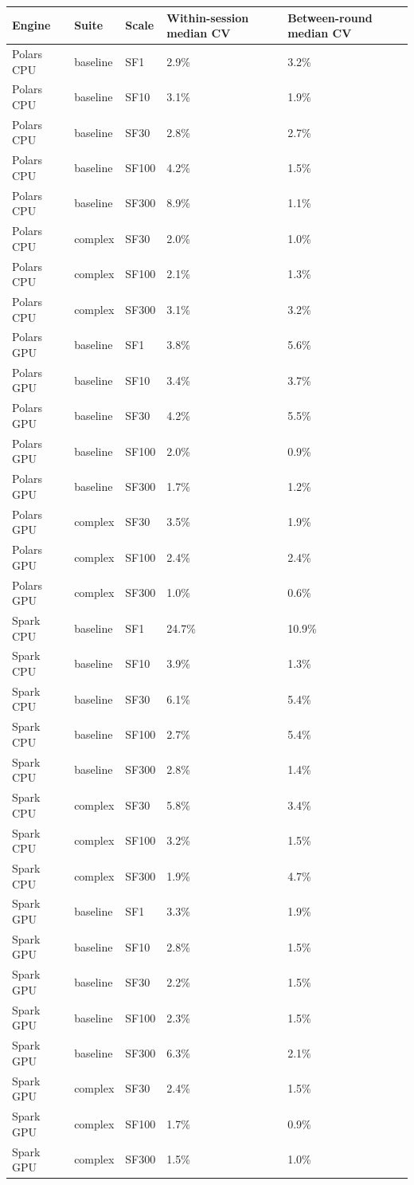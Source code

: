 \begin{tabular}{lllll}
\toprule
Engine & Suite & Scale & Within-session median CV & Between-round median CV \\
\midrule
Polars CPU & baseline & SF1 & 2.9\% & 3.2\% \\
Polars CPU & baseline & SF10 & 3.1\% & 1.9\% \\
Polars CPU & baseline & SF30 & 2.8\% & 2.7\% \\
Polars CPU & baseline & SF100 & 4.2\% & 1.5\% \\
Polars CPU & baseline & SF300 & 8.9\% & 1.1\% \\
Polars CPU & complex & SF30 & 2.0\% & 1.0\% \\
Polars CPU & complex & SF100 & 2.1\% & 1.3\% \\
Polars CPU & complex & SF300 & 3.1\% & 3.2\% \\
Polars GPU & baseline & SF1 & 3.8\% & 5.6\% \\
Polars GPU & baseline & SF10 & 3.4\% & 3.7\% \\
Polars GPU & baseline & SF30 & 4.2\% & 5.5\% \\
Polars GPU & baseline & SF100 & 2.0\% & 0.9\% \\
Polars GPU & baseline & SF300 & 1.7\% & 1.2\% \\
Polars GPU & complex & SF30 & 3.5\% & 1.9\% \\
Polars GPU & complex & SF100 & 2.4\% & 2.4\% \\
Polars GPU & complex & SF300 & 1.0\% & 0.6\% \\
Spark CPU & baseline & SF1 & 24.7\% & 10.9\% \\
Spark CPU & baseline & SF10 & 3.9\% & 1.3\% \\
Spark CPU & baseline & SF30 & 6.1\% & 5.4\% \\
Spark CPU & baseline & SF100 & 2.7\% & 5.4\% \\
Spark CPU & baseline & SF300 & 2.8\% & 1.4\% \\
Spark CPU & complex & SF30 & 5.8\% & 3.4\% \\
Spark CPU & complex & SF100 & 3.2\% & 1.5\% \\
Spark CPU & complex & SF300 & 1.9\% & 4.7\% \\
Spark GPU & baseline & SF1 & 3.3\% & 1.9\% \\
Spark GPU & baseline & SF10 & 2.8\% & 1.5\% \\
Spark GPU & baseline & SF30 & 2.2\% & 1.5\% \\
Spark GPU & baseline & SF100 & 2.3\% & 1.5\% \\
Spark GPU & baseline & SF300 & 6.3\% & 2.1\% \\
Spark GPU & complex & SF30 & 2.4\% & 1.5\% \\
Spark GPU & complex & SF100 & 1.7\% & 0.9\% \\
Spark GPU & complex & SF300 & 1.5\% & 1.0\% \\
\bottomrule
\end{tabular}
